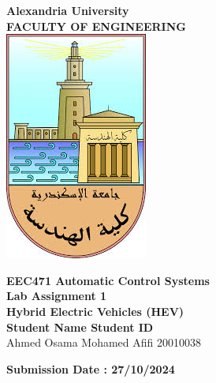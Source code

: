\documentclass[a4paper, 12pt, english]{article}
\begin{document}
\begin{titlepage}
\begin{center}
\textbf{\LARGE Alexandria University}\\[0.5cm] 
\textbf{\large FACULTY OF ENGINEERING}\\[0.2cm]
\vspace{20pt}
\includegraphics{logo.png}\\[1cm]
\par
\vspace{20pt}
\textbf{\Large EEC471 Automatic Control Systems}\\
\vspace{15pt}
\myrule[1pt][7pt]
\textbf{\LARGE  Lab Assignment 1}\\
\vspace{15pt}
\textbf{\large Hybrid Electric Vehicles (HEV)}\\
\myrule[1pt][7pt]
\vspace{25pt}
\textbf{\large \hspace{50pt}Student Name \hspace{60pt} Student ID}\\
Ahmed Osama Mohamed Afifi \hspace{60pt} 20010038 \\

\vspace{45pt}
\end{center}

\par
\vfill
\begin{center}
\textbf{Submission Date : 27/10/2024}\\
\end{center}

\end{titlepage}
\end{document}
